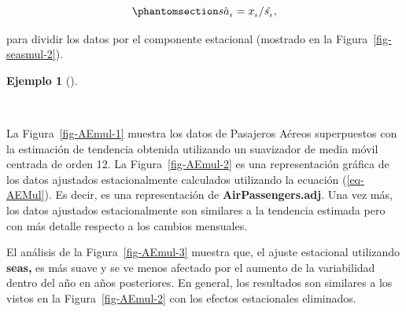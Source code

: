 \documentclass[
  us-letterpaper,
]{scrreprt}
\newenvironment{Shaded}{\begin{snugshade}}{\end{snugshade}}
\newcommand{\AttributeTok}[1]{\textcolor[rgb]{0.40,0.45,0.13}{#1}}
\newcommand{\DecValTok}[1]{\textcolor[rgb]{0.68,0.00,0.00}{#1}}
\newcommand{\FunctionTok}[1]{\textcolor[rgb]{0.28,0.35,0.67}{#1}}
\newcommand{\NormalTok}[1]{\textcolor[rgb]{0.00,0.23,0.31}{#1}}
\newcommand{\OtherTok}[1]{\textcolor[rgb]{0.00,0.23,0.31}{#1}}
\newcommand{\SpecialCharTok}[1]{\textcolor[rgb]{0.37,0.37,0.37}{#1}}
\theoremstyle{plain}
\theoremstyle{definition}
\theoremstyle{definition}
\newtheorem{example}{Ejemplo}[chapter]
\theoremstyle{plain}
\theoremstyle{remark}
\begin{document}
\begin{equation}\phantomsection\label{eq-AEMul}{
\hat{sa_{_t}}=x_{_t}/\hat{s_{_t}},
}\end{equation}

para dividir los datos por el componente estacional (mostrado en la
Figura~\ref{fig-seasmul-2}).

\begin{example}[]\protect\hypertarget{exm-aeair}{}\label{exm-aeair}

~

\begin{tcolorbox}[enhanced jigsaw, breakable, colbacktitle=quarto-callout-caution-color!10!white, rightrule=.15mm, toptitle=1mm, colback=white, left=2mm, colframe=quarto-callout-caution-color-frame, bottomtitle=1mm, opacitybacktitle=0.6, leftrule=.75mm, arc=.35mm, title={AirPassengers}, coltitle=black, titlerule=0mm, opacityback=0, bottomrule=.15mm, toprule=.15mm]

La Figura~\ref{fig-AEmul-1} muestra los datos de Pasajeros Aéreos
superpuestos con la estimación de tendencia obtenida utilizando un
suavizador de media móvil centrada de orden 12. La
Figura~\ref{fig-AEmul-2} es una representación gráfica de los datos
ajustados estacionalmente calculados utilizando la ecuación
(\ref{eq-AEMul}). Es decir, es una representación de
\textbf{AirPassengers.adj}. Una vez más, los datos ajustados
estacionalmente son similares a la tendencia estimada pero con más
detalle respecto a los cambios mensuales.

El análisis de la Figura~\ref{fig-AEmul-3} muestra que, el ajuste
estacional utilizando \textbf{seas,} es más suave y se ve menos afectado
por el aumento de la variabilidad dentro del año en años posteriores. En
general, los resultados son similares a los vistos en la
Figura~\ref{fig-AEmul-2} con los efectos estacionales eliminados.

\begin{Shaded}
\end{Shaded}


\end{tcolorbox}
\end{example}
\end{document}
